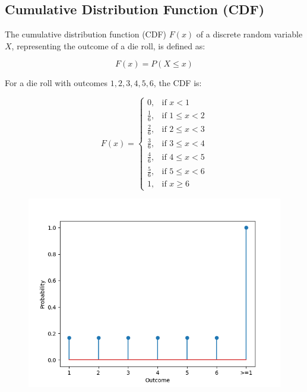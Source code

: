 \documentclass[journal]{IEEEtran}
\begin{document}
	\subsection*{Cumulative Distribution Function (CDF)}
	
	The cumulative distribution function (CDF) \(F(x)\) of a discrete random variable \(X\), representing the outcome of a die roll, is defined as:
	
	\[
	F(x) = P(X \leq x)
	\]
	
	For a die roll with outcomes \(1, 2, 3, 4, 5, 6\), the CDF is:
	
	\[
	F(x) =
	\begin{cases}
		0, & \text{if } x < 1 \\
		\frac{1}{6}, & \text{if } 1 \leq x < 2 \\
		\frac{2}{6}, & \text{if } 2 \leq x < 3 \\
		\frac{3}{6}, & \text{if } 3 \leq x < 4 \\
		\frac{4}{6}, & \text{if } 4 \leq x < 5 \\
		\frac{5}{6}, & \text{if } 5 \leq x < 6 \\
		1, & \text{if } x \geq 6
	\end{cases}
	\]
	
	\begin{figure}[h!]
		\centering
		\includegraphics[width=\columnwidth]{figs/Fig.png}
		\label{stemplot}
	\end{figure}
	
\end{document}
